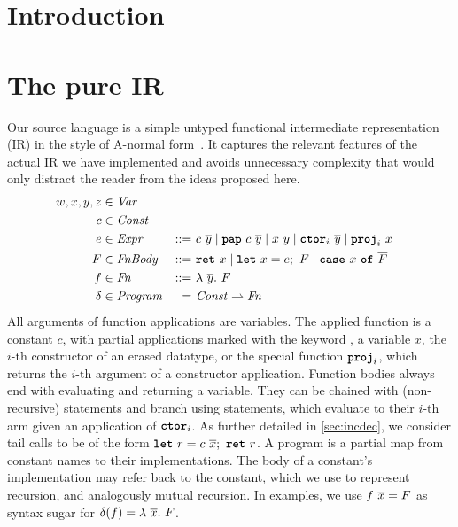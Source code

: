\documentclass[sigconf]{acmart}
\begin{document}
\maketitle

\section{Introduction}
\label{sec:intro}



\section{The pure IR}
\label{sec:pure}

Our source language \pureIR{} is a simple untyped functional
intermediate representation (IR) in the style of A-normal
form~\cite{Flanagan:1993:ECC:155090.155113}. It captures the relevant
features of the actual IR we have implemented and avoids unnecessary
complexity that would only distract the reader from the ideas proposed here.
\begin{alignat*}{3}
  w, x, y, z \syncat{Var}\\
  c \syncat{Const}\\
  e \syncat{Expr} &::=&\ c\ \many{y} \mid \Pap c \many{y} \mid x\ y \mid \Ctor_i \many{y} \mid \Proj_i x \\
  F \syncat{FnBody} &::=&\ \Ret x \mid \Let x = e; F \mid \Case x \many{F} \\
  f \syncat{Fn} &::=&\ \Lambda \many{y}. F \\
  \delta \syncat{Program} &=&\ \ty{Const} \rightharpoonup \ty{Fn}
\end{alignat*}
All arguments of function applications are variables. The applied function is
a constant $c$, with partial applications marked with the keyword , a
variable $x$, the $i$-th constructor of an
erased datatype, or the special function $\texttt{\textbf{proj}}_i$, which returns the $i$-th
argument of a constructor application. Function bodies always end with
evaluating and returning a variable.
They can be chained with (non-recursive)  statements and branch using 
statements, which evaluate to their $i$-th arm given an application of $\texttt{\textbf{ctor}}_i$.
As further detailed in \cref{sec:incdec}, we consider tail calls to be of the form
$\kw{let}\ r = c\ \many{x};\ \kw{ret}\ r$.
A program is a partial map from constant names to their implementations. The
body of a constant's implementation may refer back to the constant,
which we use to represent recursion, and analogously mutual recursion.
In examples, we use $f\ \overline{x} = F$ as syntax sugar for $\delta(f) = \lambda\ \overline{x}.\ F$.
\end{document}
